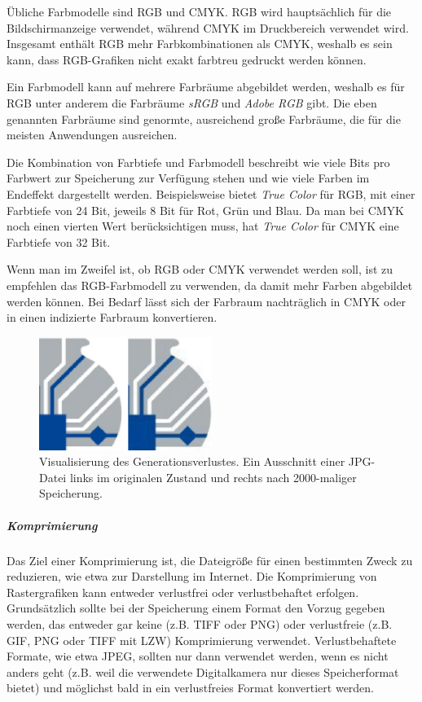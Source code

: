 Übliche Farbmodelle sind RGB und CMYK. RGB wird hauptsächlich für die Bildschirmanzeige verwendet, während CMYK im Druckbereich verwendet wird. Insgesamt enthält RGB mehr Farbkombinationen als CMYK, weshalb es sein kann, dass RGB-Grafiken nicht exakt farbtreu gedruckt werden können. 

Ein Farbmodell kann auf mehrere Farbräume abgebildet werden, weshalb es für RGB unter anderem die Farbräume \emph{sRGB} und \emph{Adobe RGB} gibt. Die eben genannten Farbräume sind genormte, ausreichend große Farbräume, die für die meisten Anwendungen ausreichen.

Die Kombination von Farbtiefe und Farbmodell beschreibt wie viele Bits pro Farbwert zur Speicherung zur Verfügung stehen und wie viele Farben im Endeffekt dargestellt werden. Beispielsweise bietet \emph{True Color} für RGB, mit einer Farbtiefe von 24 Bit, jeweils 8 Bit für Rot, Grün und Blau. Da man bei CMYK noch einen vierten Wert berücksichtigen muss, hat \emph{True Color} für CMYK eine Farbtiefe von 32 Bit.

Wenn man im Zweifel ist, ob RGB oder CMYK verwendet werden soll, ist zu empfehlen das RGB-Farbmodell zu verwenden, da damit mehr Farben abgebildet werden können. Bei Bedarf lässt sich der Farbraum nachträglich in CMYK oder in einen indizierte Farbraum konvertieren.

\begin{figure}
  \begin{center}
    \includegraphics[width=0.5\textwidth]{bilder/RG_generationsverlust}
  \end{center}
  \caption{Visualisierung des Generationsverlustes. Ein Ausschnitt einer JPG-Datei links im originalen Zustand und rechts nach 2000-maliger Speicherung.}
\end{figure}
\subparagraph{Komprimierung} Das Ziel einer Komprimierung ist, die Dateigröße für einen bestimmten Zweck zu reduzieren, wie etwa zur Darstellung im Internet. Die Komprimierung von Rastergrafiken kann entweder verlustfrei oder verlustbehaftet erfolgen. Grundsätzlich sollte bei der Speicherung einem Format den Vorzug gegeben werden, das entweder gar keine (z.B. TIFF oder PNG) oder verlustfreie (z.B. GIF, PNG oder TIFF mit LZW) Komprimierung verwendet. Verlustbehaftete Formate, wie etwa JPEG, sollten nur dann verwendet werden, wenn es nicht anders geht (z.B. weil die verwendete Digitalkamera nur dieses Speicherformat bietet) und möglichst bald in ein verlustfreies Format konvertiert werden.

